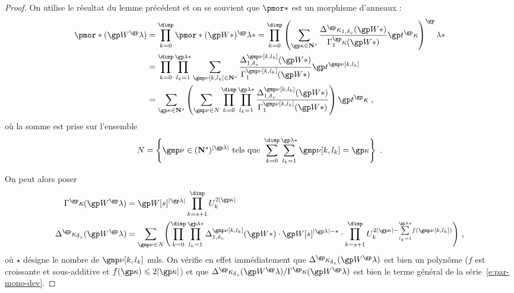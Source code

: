 \begin{proof}
  On utilise le résultat du lemme précédent et on se souvient que \( \pmor* \)
  est un morphisme d'anneaux :
  \newcommand \indl {{ \gmp\nu[\ind, \indi_\ind] }}
  \begin{align}
    \pmor*( \anyvp^\ip )
    & =
    \prod\indrange \pmor*( \anyvp* )^\ip*
    =
    \prod\indrange \left(
      \sum_{\derp \in \N^\anydim}
      \frac {
        \pmnum^\derp_{1, \dv}( \anyvp* )
      }{
        \pmden_1^\derp    ( \anyvp* )
      }
      \psp^\derp
    \right) ^\ip*
    \\ & =
    \prod\indrange
    \prod_{ \indi_\ind = 1 }^{ \ip* }
    \sum _{ \indl \in \N^\anydim }
    \frac {
      \pmnum^\indl_{1, \dv}( \anyvp* )
    }{
      \pmden_1^\indl    ( \anyvp* )
    }
    \psp^\indl
    \\ & =
    \sum_{\derp \in \N^\anydim}
    \left(
      \sum_{\gmp\nu \in N}
      \prod\indrange
      \prod_{ \indi_\ind = 1 }^{ \ip* }
      \frac {
        \pmnum^\indl_{1, \dv}( \anyvp* )
      }{
        \pmden_1^\indl    ( \anyvp* )
      }
    \right)
    \psp^\derp
    \pmm,
    \label{e:par-mono-dev}
  \end{align}
  où la somme est prise sur l'ensemble
  \begin{equation}
    N = \left\{
      \gmp\nu \in (\N^\anydim)^{\lgr\ip}
      \text{ tels que }
      \sum\indrange \sum_{\indi_\ind = 1}^{\ip*} \indl = \derp
    \right\}
    \pmm.
  \end{equation}

  On peut alors poser
  \begin{align}
    \pmden^\derp    ( \anyvp^\ip )
    & =
    \anyvp[\anydim]^{\lgr\ip}
    \prod_{\ind = \anydim + 1}^{\dimp} \pden_\ind^{2\lgr\derp}
    \\
    \pmnum^\derp_\dv( \anyvp^\ip )
    & =
    \sum_{\gmp\nu \in N}
    \Biggl(
    \prod\indrange
    \prod_{ \indi_\ind = 1 }^{ \ip* }
    \pmnum^\indl_{1, \dv}( \anyvp* )
    \cdot
    \anyvp[\anydim]^{\lgr\ip - \star}
    \cdot
    \prod_{\ind = \anydim + 1}^{\dimp}
    \pden_\ind^{ 2\lgr\derp
      - \smash{ \sum\limits_{\indi_\ind = 1}^{\ip*} } f(\indl) }
    \Biggr)
    \pmm,
  \end{align}
  où \( \star \) désigne le nombre de \( \indl \) nuls. On vérifie en effet
  immédiatement que \( \pmnum^\derp_\dv( \anyvp^\ip ) \) est bien un polynôme
  (\( f \) est croissante et sous-additive et \( f(\derp) \le 2\lgr\derp \))
  et que \( \pmnum^\derp_\dv( \anyvp^\ip ) / \pmden^\derp ( \anyvp^\ip ) \)
  est bien le terme général de la série~\ref{e:par-mono-dev}.


\end{proof}
